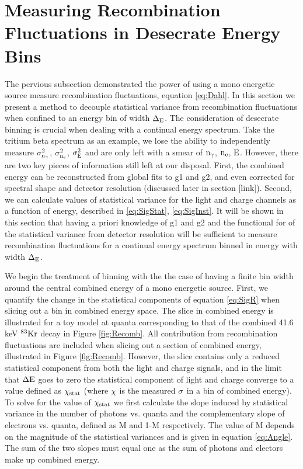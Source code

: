 \section{Measuring Recombination Fluctuations in Desecrate Energy Bins}
\label{sec:flucs_mono_bins}

The pervious subsection demonstrated the power of using a mono energetic source measure recombination fluctuations, equation  \ref{eq:Dahl}. In this section we present a method to decouple statistical variance from recombination fluctuations when confined to an energy bin of width $\rm \Delta_E$. The consideration of desecrate binning is crucial when dealing with a continual energy spectrum. Take the tritium beta spectrum as an example, we lose the ability to independently measure $\rm \sigma_{n_\gamma}^2$, $\rm \sigma_{n_e}^2$, $\rm \sigma_{E}^2 $ and are only left with a smear of $\rm n_\gamma$, $\rm n_e$, $\rm E $. However, there are two key pieces of information still left at our disposal. First, the combined energy can be reconstructed from global fits to g1 and g2, and even corrected for spectral shape and detector resolution (discussed later in section [link]). Second, we can calculate values of statistical variance for the light and charge channels as a function of energy, described in \ref{eq:SigStat},  \ref{eq:SigInst}. It will be shown in this section that having a priori knowledge of g1 and g2 and the functional for of the statistical variance from detector resolution will be sufficient to measure recombination fluctuations for a continual energy spectrum binned in energy with width $\rm \Delta_E$.


We begin the treatment of binning with the the case of having a finite bin width around the central combined energy of a mono energetic source. First, we quantify the change in the statistical components of equation \ref{eq:SigR} when slicing out a bin in combined energy space. The slice in combined energy is illustrated for a toy model at quanta corresponding to that of the combined 41.6 keV $\rm^{83}Kr$ decay in Figure \ref{fig:Recomb}. All contribution from recombination fluctuations are included when slicing out a section of combined energy, illustrated in Figure \ref{fig:Recomb}. However, the slice contains only a reduced statistical component from both the light and charge signals, and in the limit that $\rm \Delta E$ goes to zero the statistical component of light and charge converge to a value defined as $\rm \chi_{stat}$ (where $\rm \chi$ is the measured $\rm \sigma$ in a bin of combined energy). To solve for the value of  $\rm \chi_{stat}$ we first calculate the slope induced by statistical variance in the number of photons vs. quanta and the complementary slope of electrons vs. quanta, defined as M and 1-M respectively.  The value of M depends on the magnitude of the statistical variances and is given in equation \ref{eq:Angle}. The sum of the two slopes must equal one as the sum of photons and electors make up combined energy.


